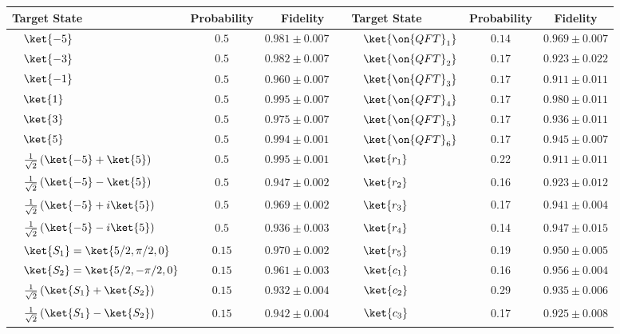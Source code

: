 \begin{table}[tbh]
\centering%
\fontsize{10pt}{10pt}\selectfont
\begin{tabular}{lcc|lcc}
\toprule
Target State & Probability  & Fidelity & Target State & Probability  & Fidelity \\
\midrule
 $\quad\ket{-5}$ & $0.5$  & $0.981 \pm 0.007\quad$ & $\quad\ket{\on{QFT}_1}$ & $0.14$ & $0.969\pm 0.007$\\
 $\quad\ket{-3}$ & $0.5$ & $0.982 \pm 0.007\quad$ & $\quad\ket{\on{QFT}_2}$ & $0.17$ & $0.923\pm 0.022$ \\
 $\quad\ket{-1}$ & $0.5$ & $0.960 \pm 0.007\quad$ & $\quad\ket{\on{QFT}_3}$ & $0.17$ & $0.911\pm 0.011$\\ 
 $\quad\ket{1}$ & $0.5$ & $0.995 \pm 0.007\quad$ & $\quad\ket{\on{QFT}_4}$&$0.17$ &  $0.980\pm 0.011$ \\
 $\quad\ket{3}$ & $0.5$ & $0.975 \pm 0.007\quad$ & $\quad\ket{\on{QFT}_5 }$& $0.17$& $0.936\pm 0.011$ \\
 $\quad\ket{5}$ & $0.5$ & $0.994 \pm 0.001\quad$ & $\quad\ket{\on{QFT}_6} $& $0.17$ & $0.945\pm 0.007$ \\
 $\quad\frac{1}{\sqrt{2}}\left(\ket{-5}+\ket{5} \right)$ & $0.5$  & $0.995 \pm 0.001\quad$ &$\quad\ket{r_1}$ & 0.22& $0.911\pm0.011$\\
 $\quad\frac{1}{\sqrt{2}}\left(\ket{-5}-\ket{5}\right)$ & $0.5$ & $0.947 \pm 0.002\quad$ &$\quad\ket{r_2}$  & 0.16 & $0.923 \pm 0.012$\\
 $\quad\frac{1}{\sqrt{2}}\left(\ket{-5}+i\ket{5}\right)$ & $0.5$ & $0.969 \pm 0.002\quad$ &$\quad\ket{r_3}$  & 0.17 & $0.941 \pm 0.004$\\ 
  $\quad\frac{1}{\sqrt{2}}\left(\ket{-5}-i\ket{5}\right)$ & $0.5$ & $0.936 \pm 0.003\quad$&$\quad\ket{r_4} $& 0.14 &$0.947 \pm 0.015$  \\
 $\quad\ket{S_1}=\ket{5/2,\pi /2,0}$ & $0.15$ & $0.970 \pm 0.002\quad$ &$\quad\ket{r_5}$ & 0.19 & $0.950\pm0.005$  \\
 $\quad\ket{S_2}=\ket{5/2,-\pi /2,0}$ & $0.15$ & $0.961 \pm 0.003\quad$ &$\quad\ket{c_1}$ &0.16 & $0.956\pm0.004$ \\
 $\quad\frac{1}{\sqrt{2}}\left(\ket{S_1}+\ket{S_2}\right)$ & $0.15$ & $0.932 \pm 0.004\quad$&$\quad\ket{c_2}$ & 0.29 &$0.935 \pm 0.006$  \\
 $\quad\frac{1}{\sqrt{2}}\left(\ket{S_1}-\ket{S_2}\right)$ & $0.15$ & $0.942 \pm 0.004\quad$& $\quad\ket{c_3}$& 0.17 & $0.925\pm 0.008$ \\

\end{tabular}
\end{table}
